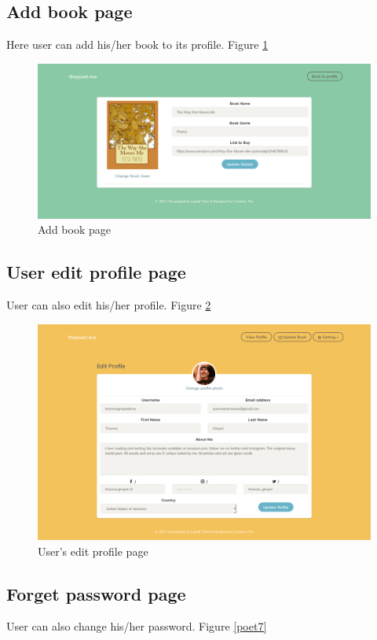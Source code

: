 \subsection{Add book page}
Here user can add his/her book to its profile. Figure \ref{poet5}

\begin{figure}
    \centering \includegraphics[scale=0.35]{images/app/poetuseraddbook-fullpage.png}
    \caption{Add book page}
    \label{poet5}
\end{figure}

\subsection{User edit profile page}
User can also edit his/her profile. Figure \ref{poet6}

\begin{figure}
    \centering \includegraphics[scale=0.35]{images/app/poetusereditprofile-fullpage.png}
    \caption{User's edit profile page}
    \label{poet6}
\end{figure}

\subsection{Forget password page}
User can also change his/her password. Figure \ref{poet7}

